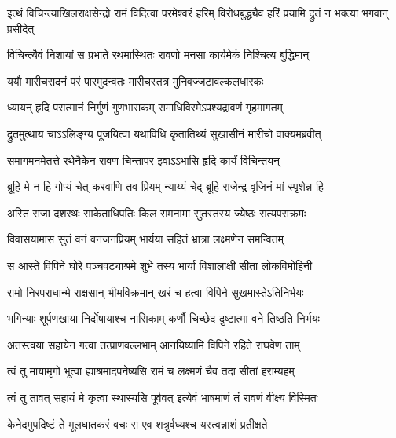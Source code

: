 \fourlineindentedshloka
{इत्थं विचिन्त्याखिलराक्षसेन्द्रो}
{रामं विदित्वा परमेश्वरं हरिम्}
{विरोधबुद्ध्यैव हरिं प्रयामि}
{द्रुतं न भक्त्या भगवान् प्रसीदेत्} %





\twolineshloka
{विचिन्त्यैवं निशायां स प्रभाते रथमास्थितः}
{रावणो मनसा कार्यमेकं निश्चित्य बुद्धिमान्} %

\twolineshloka
{ययौ मारीचसदनं परं पारमुदन्वतः}
{मारीचस्तत्र मुनिवज्जटावल्कलधारकः} %

\twolineshloka
{ध्यायन् हृदि परात्मानं निर्गुणं गुणभासकम्}
{समाधिविरमेऽपश्यद्रावणं गृहमागतम्} %

\twolineshloka
{द्रुतमुत्थाय चाऽऽलिङ्ग्य पूजयित्वा यथाविधि}
{कृतातिथ्यं सुखासीनं मारीचो वाक्यमब्रवीत्} %

\twolineshloka
{समागमनमेतत्ते रथेनैकेन रावण}
{चिन्तापर इवाऽऽभासि हृदि कार्यं विचिन्तयन्} %

\twolineshloka
{ब्रूहि मे न हि गोप्यं चेत् करवाणि तव प्रियम्}
{न्याय्यं चेद् ब्रूहि राजेन्द्र वृजिनं मां स्पृशेन्न हि} %


\twolineshloka
{अस्ति राजा दशरथः साकेताधिपतिः किल}
{रामनामा सुतस्तस्य ज्येष्ठः सत्यपराक्रमः} %

\twolineshloka
{विवासयामास सुतं वनं वनजनप्रियम्}
{भार्यया सहितं भ्रात्रा लक्ष्मणेन समन्वितम्} %

\twolineshloka
{स आस्ते विपिने घोरे पञ्चवट्याश्रमे शुभे}
{तस्य भार्या विशालाक्षी सीता लोकविमोहिनी} %

\twolineshloka
{रामो निरपराधान्मे राक्षसान् भीमविक्रमान्}
{खरं च हत्वा विपिने सुखमास्तेऽतिनिर्भयः} %

\twolineshloka
{भगिन्याः शूर्पणखाया निर्दोषायाश्च नासिकाम्}
{कर्णौ चिच्छेद दुष्टात्मा वने तिष्ठति निर्भयः} %

\twolineshloka
{अतस्त्वया सहायेन गत्वा तत्प्राणवल्लभाम्}
{आनयिष्यामि विपिने रहिते राघवेण ताम्} %

\twolineshloka
{त्वं तु मायामृगो भूत्वा ह्याश्रमादपनेष्यसि}
{रामं च लक्ष्मणं चैव तदा सीतां हराम्यहम्} %

\twolineshloka
{त्वं तु तावत् सहायं मे कृत्वा स्थास्यसि पूर्ववत्}
{इत्येवं भाषमाणं तं रावणं वीक्ष्य विस्मितः} %

\twolineshloka
{केनेदमुपदिष्टं ते मूलघातकरं वचः}
{स एव शत्रुर्वध्यश्च यस्त्वन्नाशं प्रतीक्षते} %

